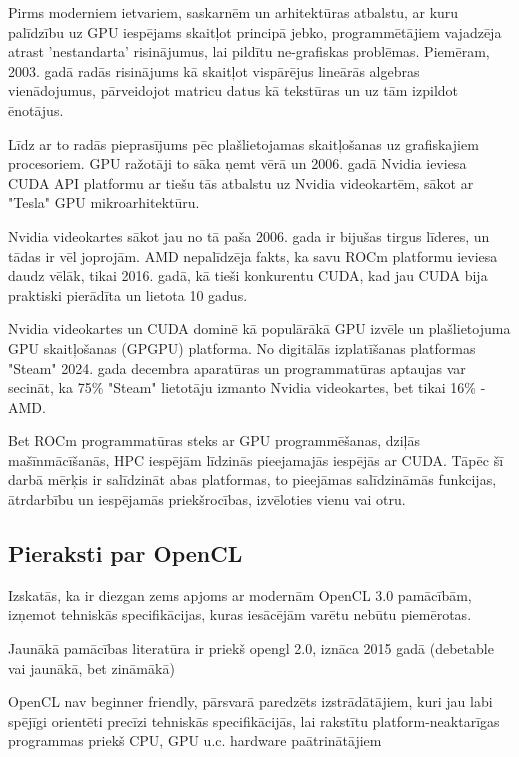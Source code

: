 \documentclass[12pt]{report}%
\theoremstyle{definition}
\begin{document}
Pirms moderniem ietvariem, saskarnēm un arhitektūras atbalstu, ar kuru palīdzību uz GPU iespējams skaitļot
principā jebko, programmētājiem vajadzēja atrast 'nestandarta' risinājumus, lai pildītu ne-grafiskas problēmas.
Piemēram, 2003. gadā radās risinājums kā skaitļot vispārējus lineārās algebras vienādojumus,
pārveidojot matricu datus kā tekstūras un uz tām izpildot ēnotājus. \cite{10.1145/882262.882363}

Līdz ar to radās pieprasījums pēc plašlietojamas skaitļošanas uz grafiskajiem procesoriem. GPU ražotāji
to sāka ņemt vērā un 2006. gadā Nvidia ieviesa CUDA API platformu ar tiešu tās atbalstu uz Nvidia 
videokartēm, sākot ar "Tesla" GPU mikroarhitektūru.\cite{nvidia_tesla_p100}

Nvidia videokartes sākot jau no tā paša 2006. gada ir bijušas tirgus līderes, un tādas ir vēl joprojām.
AMD nepalīdzēja fakts, ka savu ROCm platformu ieviesa daudz vēlāk, tikai 2016. gadā, kā tieši konkurentu CUDA,
kad jau CUDA bija praktiski pierādīta un lietota 10 gadus.

Nvidia videokartes un CUDA dominē kā populārākā GPU izvēle un plašlietojuma GPU skaitļošanas (GPGPU)
platforma. No digitālās izplatīšanas platformas "Steam" 2024. gada decembra aparatūras un programmatūras
aptaujas var secināt, ka 75\% "Steam" lietotāju izmanto Nvidia videokartes, bet tikai 16\% - AMD.
\cite{steam_survey}

Bet ROCm programmatūras steks ar GPU programmēšanas, dziļās mašīnmācīšanās, HPC iespējām līdzinās
pieejamajās iespējās ar CUDA. Tāpēc šī darbā mērķis ir salīdzināt abas platformas, to pieejāmas salīdzināmās
funkcijas, ātrdarbību un iespējamās priekšrocības, izvēloties vienu vai otru.


\begin{center}
\chapter{Pieraksti par OpenCL}
\end{center}

Izskatās, ka ir diezgan zems apjoms ar modernām OpenCL 3.0 pamācībām, izņemot
tehniskās specifikācijas, kuras iesācējām varētu nebūtu piemērotas.

Jaunākā pamācības literatūra ir priekš opengl 2.0, iznāca 2015 gadā
\cite{heterogeneous-computing-with-opencl-2-0}(debetable vai jaunākā, bet
zināmākā)

OpenCL nav beginner friendly, pārsvarā paredzēts izstrādātājiem, kuri jau labi spējīgi orientēti precīzi tehniskās specifikācijās,
lai rakstītu platform-neaktarīgas programmas priekš CPU, GPU u.c. hardware paātrinātājiem
\end{document}
